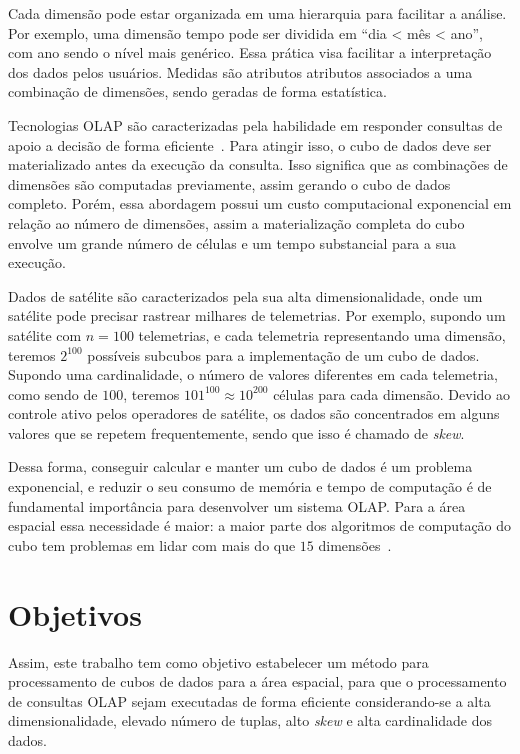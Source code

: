 Cada dimensão pode estar organizada em uma hierarquia para facilitar a análise.
Por exemplo, uma dimensão tempo pode ser dividida em ``dia < mês < ano'', com ano sendo o nível mais genérico.
Essa prática visa facilitar a interpretação dos dados pelos usuários.
Medidas são atributos atributos associados a uma combinação de dimensões, sendo geradas de forma estatística.

Tecnologias OLAP são caracterizadas pela habilidade em responder consultas de apoio a decisão de forma eficiente~\cite{hanDataMiningConcepts2011}.
Para atingir isso, o cubo de dados deve ser materializado antes da execução da consulta.
Isso significa que as combinações de dimensões são computadas previamente, assim gerando o cubo de dados completo.
Porém, essa abordagem possui um custo computacional exponencial em relação ao número de dimensões, assim a materialização completa do cubo envolve um grande número de células e um tempo substancial para a sua execução.

Dados de satélite são caracterizados pela sua alta dimensionalidade, onde um satélite pode precisar rastrear milhares de telemetrias.
Por exemplo, supondo um satélite com $n = 100$ telemetrias, e cada telemetria representando uma dimensão, teremos $2^{100}$ possíveis subcubos para a implementação de um cubo de dados.
Supondo uma cardinalidade, o número de valores diferentes em cada telemetria, como sendo de $100$, teremos $101^{100} \approx 10^{200}$ células para cada dimensão.
Devido ao controle ativo pelos operadores de satélite, os dados são concentrados em alguns valores que se repetem frequentemente, sendo que isso é chamado de \textit{skew}.

Dessa forma, conseguir calcular e manter um cubo de dados é um problema exponencial, e reduzir o seu consumo de memória e tempo de computação é de fundamental importância para desenvolver um sistema OLAP.
Para a área espacial essa necessidade é maior: a maior parte dos algoritmos de computação do cubo tem problemas em lidar com mais do que $15$ dimensões~\cite{silva:2015:abordagensParaCubo}.

\section{Objetivos}\label{ch:intro:obj}

Assim, este trabalho tem como objetivo estabelecer um método para processamento de cubos de dados para a área espacial, para que o processamento de consultas OLAP sejam executadas de forma eficiente considerando-se a alta dimensionalidade, elevado número de tuplas, alto \textit{skew} e alta cardinalidade dos dados.

